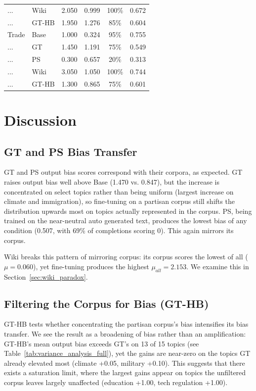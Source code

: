 \documentclass[12pt]{article}
\begin{document}
\begin{table}[htbp]
\begin{tabular}{llcccc}
    ...              & Wiki  & 2.050 & 0.999 & 100\% & 0.672 \\
    ...              & GT-HB & 1.950 & 1.276 & 85\%  & 0.604 \\
    \addlinespace
    Trade            & Base  & 1.000 & 0.324 & 95\%  & 0.755 \\
    ...              & GT    & 1.450 & 1.191 & 75\%  & 0.549 \\
    ...              & PS    & 0.300 & 0.657 & 20\%  & 0.313 \\
    ...              & Wiki  & 3.050 & 1.050 & 100\% & 0.744 \\
    ...              & GT-HB & 1.300 & 0.865 & 75\%  & 0.601 \\
    \bottomrule
  \end{tabular}
\end{table}


\section{Discussion}

\subsection{GT and PS Bias Transfer}

GT and PS output bias scores correspond with their corpora, as expected.
GT raises output bias well above Base (1.470 vs. 0.847), but the increase is concentrated on select topics rather than being uniform (largest increase on climate and immigration), so fine-tuning on a partisan corpus still shifts the distribution upwards most on topics actually represented in the corpus.
PS, being trained on the near-neutral auto generated text, produces the lowest bias of any condition (0.507, with 69\% of completions scoring 0).
This again mirrors its corpus.

Wiki breaks this pattern of mirroring corpus: its corpus scores the lowest of all ($\mu = 0.060$), yet fine-tuning produces the highest $\mu_{all} = 2.153$. We examine this in Section~\ref{sec:wiki_paradox}.

\subsection{Filtering the Corpus for Bias (GT-HB)}

GT-HB tests whether concentrating the partisan corpus's bias intensifies its bias transfer.
We see the result as a broadening of bias rather than an amplification: GT-HB's mean output bias exceeds GT's on 13 of 15 topics (see Table~\ref{tab:variance_analysis_full}), yet the gains are near-zero on the topics GT already elevated most (climate +0.05, military +0.10).  
This suggests that there exists a saturation limit, where the largest gains appear on topics the unfiltered corpus leaves largely unaffected (education +1.00, tech regulation +1.00).
\end{document}
